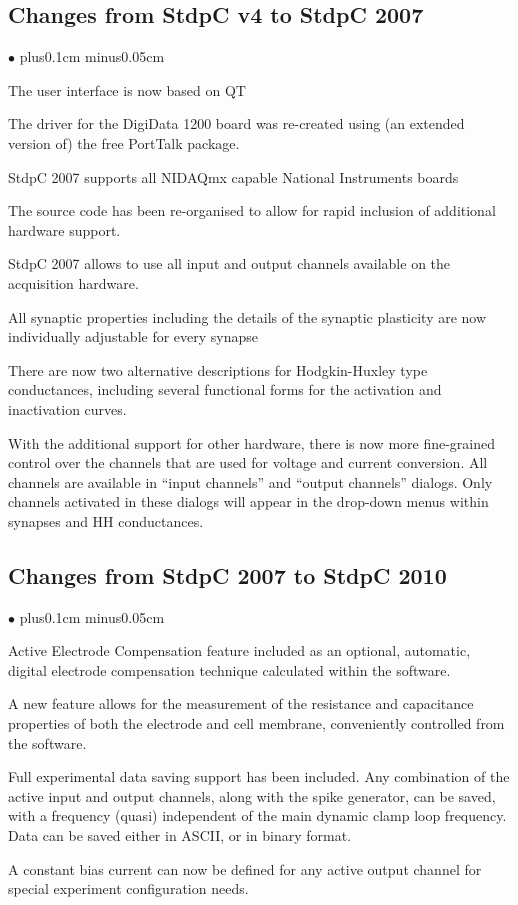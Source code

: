 \documentclass{article}
\newenvironment{myitem}{\begin{list}{$\bullet$}{\setlength{\leftmargin}{1.1em}
\itemsep0.1cm plus0.1cm minus0.05cm
\listparindent0cm
\addtolength{\labelsep}{0.5\labelsep}
\setlength{\labelwidth}{0.8em}
\setlength{\leftmargin}{\labelwidth}
\addtolength{\leftmargin}{\labelsep}
}}{\end{list}}
\begin{document}
\subsection{Changes from StdpC v4 to StdpC 2007}
\begin{myitem}
\item The user interface is now based on QT
\item The driver for the DigiData 1200 board was re-created using (an
  extended version of) the free PortTalk package.
\item StdpC 2007 supports all NIDAQmx capable National Instruments boards
\item The source code has been re-organised to allow for rapid
  inclusion of additional hardware support.
\item StdpC 2007 allows to use all input and output channels available
  on the acquisition hardware.
\item All synaptic properties including the details of the synaptic
  plasticity are now individually adjustable for every synapse
\item There are now two alternative descriptions for Hodgkin-Huxley
  type conductances, including several functional forms for the
  activation and inactivation curves.
\item With the additional support for other hardware, there is now
  more fine-grained control over the channels that are used for
  voltage and current conversion. All channels are available in
  ``input channels'' and ``output channels'' dialogs. Only channels
  activated in these dialogs will appear in the drop-down menus within
  synapses and HH conductances.
\end{myitem}

\subsection{Changes from StdpC 2007 to StdpC 2010}
\begin{myitem}
\item Active Electrode Compensation feature included as an optional,
  automatic, digital electrode compensation technique calculated within the
  software.                  
\item A new feature allows for the measurement of the resistance and
  capacitance properties of both the electrode and cell membrane,
  conveniently controlled from the software.  
\item Full experimental data saving support has been included. Any
  combination of the active input and output channels, along with the spike generator, can
  be saved, with a frequency (quasi) independent of the main dynamic clamp
  loop frequency. Data can be saved either in ASCII, or in binary format.
\item A constant bias current can now be defined for any active output
  channel for special experiment configuration needs. 
\end{myitem}
\end{document}
